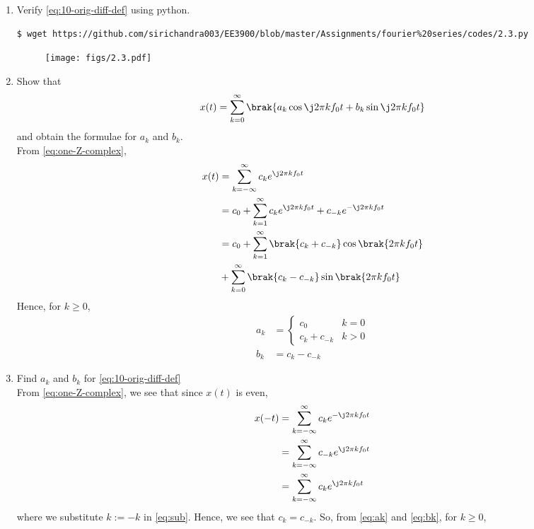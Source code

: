 \documentclass[journal,12pt,twocolumn]{IEEEtran}
\renewcommand\thesection{\arabic{section}}
\begin{document}
\begin{enumerate}[label=\thesection.\arabic*,ref=\thesection.\theenumi]
\item Verify
\eqref{eq:10-orig-diff-def}
using python. \\
\solution
\begin{lstlisting}
$ wget https://github.com/sirichandra003/EE3900/blob/master/Assignments/fourier%20series/codes/2.3.py
\end{lstlisting}
\begin{figure}[!ht]
\texttt{[image: figs/2.3.pdf]}
\caption{}
\label{fig:ver-complex}
\end{figure}
\item Show that
\begin{align}
x(t) = \sum_{k = 0}^{\infty}\brak{a_k\cos{\j2\pi kf_0 t}+b_k\sin{\j2\pi kf_0 t}}
\label{eq:one-Z-real}
\end{align}
and obtain the formulae for $a_k$ and $b_k$. \\
\solution From \eqref{eq:one-Z-complex},
\begin{align}
x(t) &= \sum_{k = -\infty}^{\infty}c_ke^{\j2\pi kf_0 t} \\
&= c_0 + \sum_{k = 1}^{\infty}c_ke^{\j2\pi kf_0t} + c_{-k}e^{-\j2\pi kf_0t} \\
&= c_0 + \sum_{k = 1}^{\infty}\brak{c_k + c_{-k}}\cos\brak{2\pi kf_0t}  \nonumber \\
&+ \sum_{k = 0}^{\infty}\brak{c_k - c_{-k}}\sin\brak{2\pi kf_0t}
\end{align}
Hence, for $k \ge 0$,
\begin{align}
a_k &=
\begin{cases}
c_0 & k = 0 \\
c_k + c_{-k} & k > 0
\end{cases} \label{eq:ak} \\
b_k &= c_k - c_{-k}
\label{eq:bk}
\end{align}
\item Find $a_k$ and $b_k$ for
\eqref{eq:10-orig-diff-def} \\
\solution From \eqref{eq:one-Z-complex}, we see that since $x(t)$ is even,
\begin{align}
x(-t) &= \sum_{k = -\infty}^{\infty}c_ke^{-\j2\pi kf_0 t} \\
&= \sum_{k = -\infty}^{\infty}c_{-k}e^{\j2\pi kf_0t} \label{eq:sub} \\
&= \sum_{k = -\infty}^{\infty}c_ke^{\j2\pi kf_0 t}
\end{align}
where we substitute $k := -k$ in \eqref{eq:sub}. Hence, we see that
$c_k = c_{-k}$. So, from \eqref{eq:ak} and \eqref{eq:bk}, for $k \ge 0$,

\end{enumerate}
\end{document}
